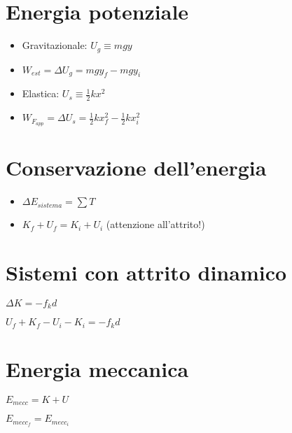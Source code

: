 \documentclass[a4paper,14pt,landscape]{extarticle}
\begin{document}
\begin{multicols*}{2}
    \section*{Energia potenziale}
    \begin{itemize}
        \item Gravitazionale: $U_g \equiv mgy$
        \item $W_{est} = \Delta U_g = mgy_f - mgy_i$
        \item Elastica: $U_s \equiv \tfrac{1}{2} kx^2$
        \item $W_{F_{app}} = \Delta U_s = \tfrac{1}{2}kx_f^2 - \tfrac{1}{2}kx_i^2$
    \end{itemize}

    \section*{Conservazione dell'energia}
    \begin{itemize}
        \item $\Delta E_{sistema} = \sum T$
        \item $K_f + U_f = K_i + U_i$ (attenzione all'attrito!)
    \end{itemize}

    \section*{Sistemi con attrito dinamico}
    \begin{itemize}
        \begin{multicols*}{2}
            \item $\Delta K = -f_kd$
            \item $U_f + K_f - U_i - K_i = -f_kd$
        \end{multicols*}
    \end{itemize}

    \section*{Energia meccanica}
    \begin{itemize}
        \begin{multicols*}{2}
            \item $E_{mecc} = K + U$
            \item $E_{mecc_f} = E_{mecc_i}$
        \end{multicols*}
    \end{itemize}


\end{multicols*}
\end{document}
